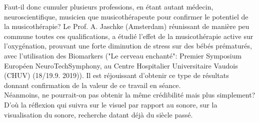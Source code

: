 Faut-il donc cumuler plusieurs professions, en étant autant médecin, neuroscientifique,  musicien que 
musicothérapeute 
pour confirmer le potentiel de la musicothérapie? 
Le  Prof. A. Jaschke (Amsterdam)
réunissant de 
manière peu commune toutes ces qualifications, a étudié  
 l'effet de la musicothérapie active sur l'oxygénation, prouvant une forte diminution 
de stress sur des
bébés prématurés, avec l'utilisation des
Biomarkers ("Le cerveau enchanté": Premier Symposium Européen 
NeuroTechSymphony, au Centre Hospitalier Universitaire Vaudois (CHUV) (18/19.9. 2019)). Il est 
réjouissant d'obtenir ce type de résultats 
donnant confirmation de la valeur de ce travail en séance.
\\
Néanmoins, %
 ne pourrait-on pas obtenir la même crédibilité mais plus 
simplement? D'où la réflexion qui suivra sur le visuel par rapport au sonore, sur la visualisation du 
sonore, recherche datant déjà 
du siècle passé.
% 

